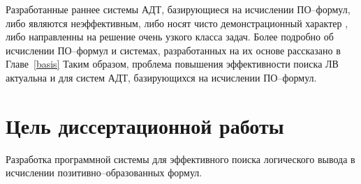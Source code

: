 Разработанные раннее системы АДТ, базирующиеся на исчислении ПО--формул, либо являются неэффективным, либо носят чисто демонстрационный характер \cite{dissChe}, либо направленны на решение очень узкого класса задач. Более подробно об исчислении ПО--формул и системах, разработанных на их основе рассказано в Главе~\ref{basis} Таким образом, проблема повышения эффективности поиска ЛВ актуальна и для систем АДТ, базирующихся на исчислении ПО--формул.









\section*{Цель диссертационной работы}
Разработка программной системы для эффективного поиска логического вывода в исчислении позитивно--образованных формул.


